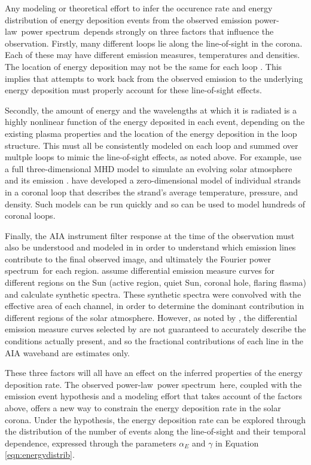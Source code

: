 \documentclass[onecolumn]{emulateapj}
\newcommand{\PS}{power spectrum}
\newcommand{\PL}{power-law}
\newcommand{\Fps}{Fourier \PS}
\begin{document}
Any modeling or theoretical effort to infer the occurence rate and
energy distribution of energy deposition events from the observed
emission \PL\ \PS\ depends strongly on three factors that influence
the observation.  Firstly, many different loops lie along the
line-of-sight in the corona.  Each of these may have different
emission measures, temperatures and densities.  The location of energy
deposition may not be the same for each loop
\citep{2003A&ARv..12....1W, 2006SoPh..234...41K}.  This implies that
attempts to work back from the observed emission to the underlying
energy deposition must properly account for these line-of-sight
effects.

Secondly, the amount of energy and the wavelengths at which it is
radiated is a highly nonlinear function of the energy deposited in
each event, depending on the existing plasma properties and the
location of the energy deposition in the loop structure.  This must
all be consistently modeled on each loop and summed over multple loops
to mimic the line-of-sight effects, as noted above.  For example,
\cite{2011ApJ...743...23M} use a full three-dimensional MHD model to
simulate an evolving solar atmosphere and its emission
\citep{2011AA...531A.154G}.  \cite{2008ApJ...682.1351K,
  0004-637X-752-2-161} have developed a zero-dimensional model of
individual strands in a coronal loop that describes the strand's
average temperature, pressure, and density.  Such models can be run
quickly and so can be used to model hundreds of coronal loops.

Finally, the AIA instrument filter response at the time of the
observation must also be understood and modeled in in order to
understand which emission lines contribute to the final observed
image, and ultimately the \Fps\ for each region.
\cite{2010AA...521A..21O} assume differential emission measure curves
for different regions on the Sun (active region, quiet Sun, coronal
hole, flaring flasma) and calculate synthetic spectra.  These
synthetic spectra were convolved with the effective area of each
channel, in order to determine the dominant contribution in different
regions of the solar atmosphere.  However, as noted by
\cite{2011ApJ...743...23M}, the differential emission measure curves
selected by \cite{2010AA...521A..21O} are not guaranteed to
accurately describe the conditions actually present, and so the
fractional contributions of each line in the AIA waveband are
estimates only.

These three factors will all have an effect on the inferred properties
of the energy deposition rate.  The observed \PL\ \PS\ here, coupled
with the emission event hypothesis and a modeling effort that takes
account of the factors above, offers a new way to constrain the energy
deposition rate in the solar corona.  Under the hypothesis, the energy
deposition rate can be explored through the distribution of the number
of events along the line-of-sight and their temporal dependence,
expressed through the parameters $\alpha_{E}$ and $\gamma$ in Equation
\ref{eqn:energydistrib}.
\end{document}
